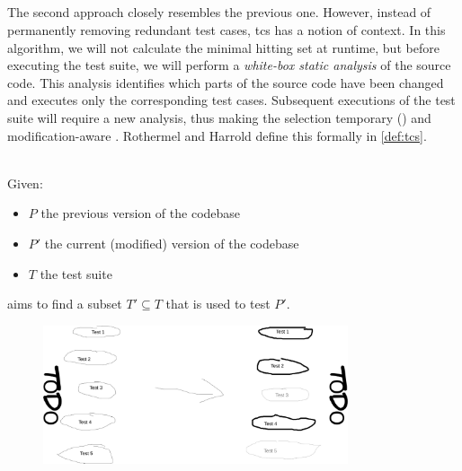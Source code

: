 
\subsection{\tcs{}}
The second approach closely resembles the previous one. However, instead of permanently removing redundant test cases, \acrfull{tcs} has a notion of context. In this algorithm, we will not calculate the minimal hitting set at runtime, but before executing the test suite, we will perform a \emph{white-box static analysis} of the source code. This analysis identifies which parts of the source code have been changed and executes only the corresponding test cases. Subsequent executions of the test suite will require a new analysis, thus making the selection temporary () and modification-aware \cite{10.1002/stv.430}. Rothermel and Harrold define this formally in \cref{def:tcs}.

\begin{definition}[\tcs{}]
\label{def:tcs}
\mbox{}\\Given:
\begin{itemize}
	\item $P$ the previous version of the codebase
	\item $P'$ the current (modified) version of the codebase
	\item $T$ the test suite
\end{itemize}

\noindent \tcs{} aims to find a subset $T' \subseteq T$ that is used to test $P'$. 
\end{definition}

\begin{figure}[htbp!]
	\centering
	\includegraphics[width=0.8\textwidth]{assets/images/approach-tcs.pdf}
	\caption{\tcs{}}
	\label{fig:tcs}
\end{figure}